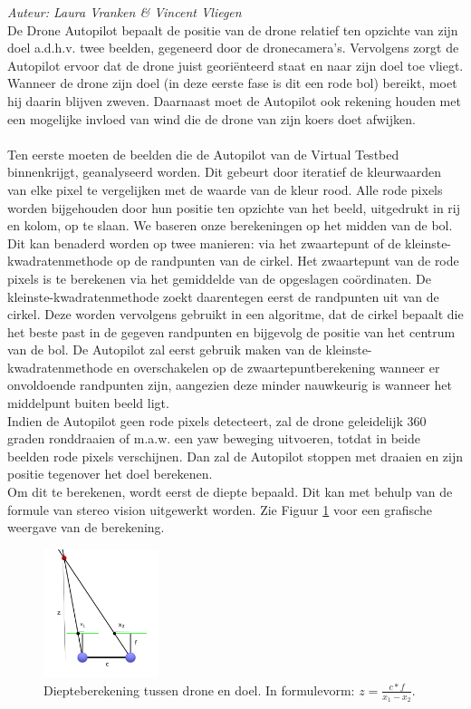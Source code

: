 {\em Auteur: Laura Vranken \& Vincent Vliegen}\\

\noindent
De Drone Autopilot bepaalt de positie van de drone relatief ten opzichte van zijn doel a.d.h.v. twee beelden, gegeneerd door de dronecamera's. Vervolgens zorgt de Autopilot ervoor dat de drone juist geori\"enteerd staat en naar zijn doel toe vliegt. Wanneer de drone zijn doel (in deze eerste fase is dit een rode bol) bereikt, moet hij daarin blijven zweven. Daarnaast moet de Autopilot ook rekening houden met een mogelijke invloed van wind die de drone van zijn koers doet afwijken.
\\
\\
Ten eerste moeten de beelden die de Autopilot van de Virtual Testbed binnenkrijgt, geanalyseerd worden. Dit gebeurt door iteratief de kleurwaarden van elke pixel te vergelijken met de waarde van de kleur rood. Alle rode pixels worden bijgehouden door hun positie ten opzichte van het beeld, uitgedrukt in rij en kolom, op te slaan. We baseren onze berekeningen op het midden van de bol. Dit kan benaderd worden op twee manieren: via het zwaartepunt of de kleinste-kwadratenmethode op de randpunten van de cirkel. Het zwaartepunt van de rode pixels is te berekenen via het gemiddelde van de opgeslagen co\"ordinaten. De kleinste-kwadratenmethode zoekt daarentegen eerst de randpunten uit van de cirkel. Deze worden vervolgens gebruikt in een algoritme, dat de cirkel bepaalt die het beste past in de gegeven randpunten en bijgevolg de positie van het centrum van de bol. \cite{website:kleinsteKwadraten} De Autopilot zal eerst gebruik maken van de kleinste-kwadratenmethode en overschakelen op de zwaartepuntberekening wanneer er onvoldoende randpunten zijn, aangezien deze minder nauwkeurig is wanneer het middelpunt buiten beeld ligt.
\\
Indien de Autopilot geen rode pixels detecteert, zal de drone geleidelijk 360 graden ronddraaien of m.a.w. een yaw beweging uitvoeren, totdat in beide beelden rode pixels verschijnen. Dan zal de Autopilot stoppen met draaien en zijn positie tegenover het doel berekenen.
\\
Om dit te berekenen, wordt eerst de diepte bepaald. Dit kan met behulp van de formule van stereo vision \cite{website:techbriefs} uitgewerkt worden.
Zie Figuur \ref{fig:DiepteberekeningDroneEnDoel} voor een grafische weergave van de berekening.
\begin{figure}[h]
	\centering
	\includegraphics[width=0.3\textwidth]{DiepteberekeningDroneEnDoel.png}
	\caption{Diepteberekening tussen drone en doel. In formulevorm: \(z = \frac{c * f}{x_1 - x_2}\).}
	\label{fig:DiepteberekeningDroneEnDoel}
\end{figure}
